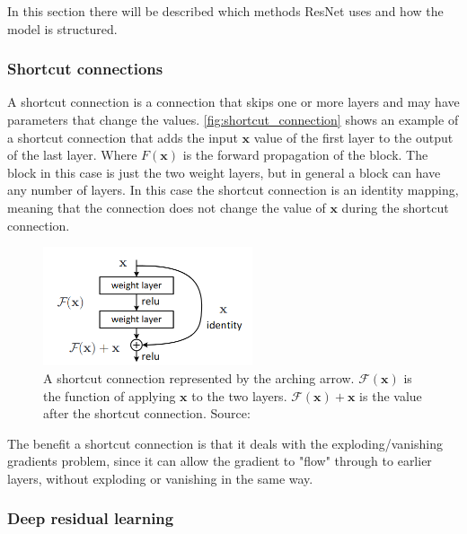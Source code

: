 In this section there will be described which methods ResNet uses and how the model is structured.


\subsubsection{Shortcut connections}

A shortcut connection is a connection that skips one or more layers and may have parameters that change the values.
\autoref{fig:shortcut_connection} shows an example of a shortcut connection that adds the input $\bm{x}$ value of the first layer to the output of the last layer.
Where $F(\bm{x})$ is the forward propagation of the block. The block in this case is just the two weight layers, but in general a block can have any number of layers.
In this case the shortcut connection is an identity mapping, meaning that the connection does not change the value of $\bm{x}$ during the shortcut connection.

\begin{figure}
    \centering
    \includegraphics[width=0.55\textwidth]{assets/shortcut-connection.png}
    \caption{A shortcut connection represented by the arching arrow. $\mathcal{F}(\bm{x})$ is the function of applying $\bm{x}$ to the two layers. $\mathcal{F}(\bm{x}) + \bm{x}$ is the value after the shortcut connection. Source: \cite{resnet}}
    \label{fig:shortcut_connection}
\end{figure}

The benefit a shortcut connection is that it deals with the exploding/vanishing gradients problem, since it can allow the gradient to "flow" through to earlier layers, without exploding or vanishing in the same way.

\subsubsection{Deep residual learning}

